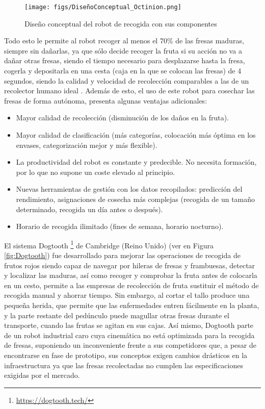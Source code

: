 \begin{figure} [H]
    \begin{center}
      \texttt{[image: figs/DiseñoConceptual\_Octinion.png]}
    \end{center}
    \caption{Diseño conceptual del robot de recogida con sus componentes}
    \label{fig:DiseñoConceptual_Octinion}
\end{figure}

Todo esto le permite al robot recoger al menos el 70\% de las fresas maduras, siempre sin dañarlas, ya que sólo decide recoger la fruta si su acción no va a dañar otras fresas, siendo el tiempo necesario para desplazarse hasta la fresa, cogerla y depositarla en una cesta (caja en la que se colocan las
fresas) de 4 segundos, siendo la calidad y velocidad de recolección comparables a las de un recolector humano ideal \cite{DePreter18}. Además de esto, el uso de este robot para cosechar las fresas de forma autónoma, presenta algunas ventajas adicionales:

\begin{itemize}
    \item Mayor calidad de recolección (disminución de los daños en la fruta).
    \item Mayor calidad de clasificación (más categorías, colocación más óptima 								en los envases, categorización mejor y más flexible).
    \item La productividad del robot es constante y predecible. No necesita formación, por lo que no supone un coste elevado al principio.
    \item Nuevas herramientas de gestión con los datos recopilados: predicción del rendimiento, asignaciones de cosecha más complejas (recogida de un tamaño
determinado, recogida un día antes o después).
    \item Horario de recogida ilimitado (fines de semana, horario nocturno).
\end{itemize}
\pagebreak

El sistema Dogtooth \footnote{\url{https://dogtooth.tech/}} de Cambridge (Reino Unido) (ver en Figura \ref{fig:Dogtooth}) fue desarrollado para mejorar las operaciones de recogida de frutos rojos siendo capaz de navegar por hileras de fresas y frambuesas, detectar y localizar las maduras, así como recoger y comprobar la fruta antes de colocarla en un cesto, permite a las empresas de recolección de fruta sustituir el método de recogida manual y ahorrar tiempo. Sin embargo, al cortar el tallo produce una pequeña herida, que permite que las enfermedades entren fácilmente en la planta, y la parte restante del pedúnculo puede magullar otras fresas durante el transporte, cuando las frutas se agitan en sus cajas. Así mismo, Dogtooth parte de un robot industrial caro cuya cinemática no está optimizada para la recogida de fresas, suponiendo un inconveniente frente a sus competidores que, a pesar de encontrarse en fase de prototipo, sus conceptos exigen cambios drásticos en la infraestructura ya que las fresas recolectadas no cumplen las especificaciones exigidas por el mercado. 

